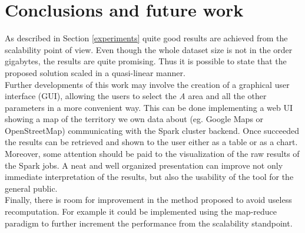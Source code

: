 \documentclass{sig-alternate-05-2015}
\begin{document}
\section{Conclusions and future work}
As described in Section \ref{experiments} quite good results are achieved from the scalability point of view. Even though the whole dataset size is not in the order gigabytes, the results are quite promising. Thus it is possible to state that the proposed solution scaled in a quasi-linear manner.\\
Further developments of this work may involve the creation of a graphical user interface (GUI), allowing the users to select the \emph{A} area and all the other parameters in a more convenient way. This can be done implementing a web UI showing a map of the territory we own data about (eg. Google Maps or OpenStreetMap) communicating with the Spark cluster backend. Once succeeded the results can be retrieved and shown to the user either as a table or as a chart.\\
Moreover, some attention should be paid to the visualization of the raw results of the Spark jobs. A neat and well organized presentation can improve not only immediate interpretation of the results, but also the usability of the tool for the general public.\\
Finally, there is room for improvement in the method proposed to avoid useless recomputation. For example it could be implemented using the map-reduce paradigm to further increment the performance from the scalability standpoint. 


%



%
%
\end{document}
